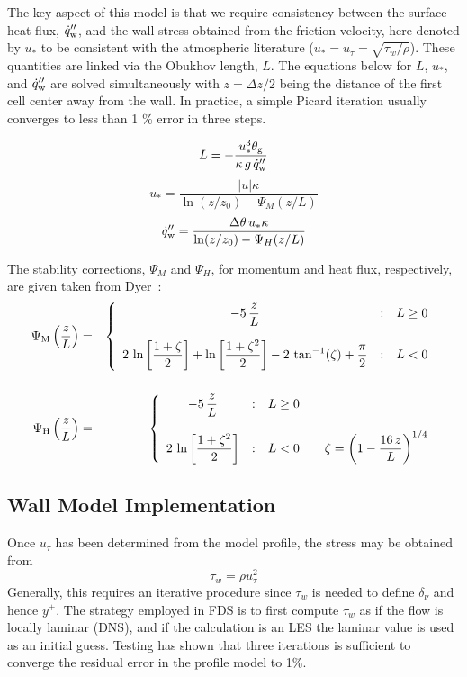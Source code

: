 The key aspect of this model is that we require consistency between the surface heat flux, $\dot{q}''_{\rm w}$, and the wall stress obtained from the friction velocity, here denoted by $u_*$ to be consistent with the atmospheric literature ($u_* = u_\tau = \sqrt{\tau_w/\rho}$).  These quantities are linked via the Obukhov length, $L$.  The equations below for $L$, $u_*$, and $\dot{q}''_{\rm w}$ are solved simultaneously with $z=\Delta z/2$ being the distance of the first cell center away from the wall.  In practice, a simple Picard iteration usually converges to less than 1 \% error in three steps.

\begin{equation}
\label{eq:obukhov_length}
L = -\frac{u_*^3 \theta_{\rm g}}{\kappa \,g\, \dot{q}''_{\rm w}}
\end{equation}
\begin{equation}
\label{eq:ustar_abl_model}
u_* = \frac{|u|\kappa}{\ln(z/z_0)-\Psi_M(z/L)}
\end{equation}
\begin{equation}
\label{eq:q_abl_model}
\dot{q}''_{\rm w} = \frac{\Delta \theta \,u_*\kappa}{\ln(z/z_0)-\Psi_H(z/L)}
\end{equation}

The stability corrections, $\Psi_M$ and $\Psi_H$, for momentum and heat flux, respectively, are given taken from Dyer~\cite{Dyer:1974}:
\begin{eqnarray}
   \Psi_{\rm M}\left(\frac{z}{L}\right) &=& \left\{ \begin{array}{c@{\quad:\quad}l} \displaystyle -5 \, \frac{z}{L} & L \ge 0 \\[.2in]  \displaystyle 2 \, \ln \left[\frac{1+\zeta}{2}\right] + \ln \left[\frac{1+\zeta^2}{2}\right]-2 \, \tan^{-1}(\zeta) + \frac{\pi}{2} & L<0 \end{array} \right.  \\[.2in]
   \Psi_{\rm H}\left(\frac{z}{L}\right) &=& \left\{ \begin{array}{c@{\quad:\quad}l} \displaystyle -5 \, \frac{z}{L} & L \ge 0 \\[.2in]  \displaystyle 2 \, \ln \left[\frac{1+\zeta^2}{2}\right] & L<0 \quad \quad  \displaystyle \zeta=\left( 1 - \frac{16 \, z}{L} \right)^{1/4}  \end{array} \right.
\end{eqnarray}

\subsection{Wall Model Implementation}
Once $u_\tau$ has been determined from the model profile, the stress may be obtained from
\begin{equation}
\label{eqn_wall_stress}
\tau_w = \rho u_\tau^2
\end{equation}
Generally, this requires an iterative procedure since $\tau_w$ is needed to define $\delta_\nu$ and hence $y^+$.  The strategy employed in FDS is to first compute $\tau_w$ as if the flow is locally laminar (DNS), and if the calculation is an LES the laminar value is used as an initial guess.  Testing has shown that three iterations is sufficient to converge the residual error in the profile model to 1\%.

